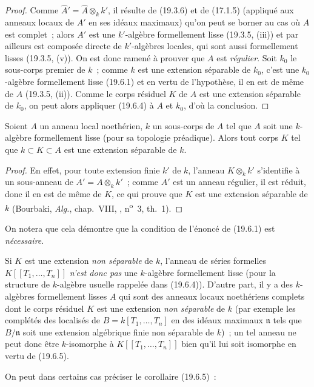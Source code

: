 \begin{proof}
Comme $\widehat A'=\widehat A\otimes_k k'$, il résulte de (19.3.6) et de
(17.1.5) (appliqué aux anneaux locaux de $A'$ en ses idéaux maximaux) qu'on
peut se borner au cas où $A$ est complet~; alors $A'$ est une $k'$-algèbre
formellement lisse (19.3.5, (iii)) et par ailleurs est composée directe de
$k'$-algèbres locales, qui sont aussi formellement lisses (19.3.5, (v)). On est
donc ramené à prouver que $A$ est \emph{régulier}. Soit $k_0$ le sous-corps
premier de $k$~; comme $k$ est une extension séparable de $k_0$, c'est une
$k_0$-algèbre formellement lisse (19.6.1) et en vertu de l'hypothèse, il en est
de même de $A$ (19.3.5, (ii)). Comme le corps résiduel $K$ de $A$ est une
extension séparable de $k_0$, on peut alors appliquer (19.6.4) à $A$ et $k_0$,
d'où la conclusion.
\end{proof}


\begin{corollary}[19.6.5.1]
\label{0.19.6.5.1-fr}
Soient $A$ un anneau local noethérien, $k$ un sous-corps de $A$ tel que $A$
soit une $k$-algèbre formellement lisse (pour sa topologie préadique). Alors
tout corps $K$ tel que $k\subset K\subset A$ est une extension séparable de
$k$.
\end{corollary}

\begin{proof}
En effet, pour toute extension finie $k'$ de $k$, l'anneau $K\otimes_k k'$ 
s'identifie à un sous-anneau de $A'=A\otimes_k k'$~; comme $A'$ est un anneau
régulier, il est réduit, donc il en est de même de $K$, ce qui prouve que $K$
est une extension séparable de $k$ (Bourbaki, \emph{Alg.}, chap.~VIII,
, n\textsuperscript{o}~3, th.~1).
\end{proof}

On notera que cela démontre que la condition de l'énoncé de (19.6.1) est
\emph{nécessaire}.

\begin{remark}[19.6.5.2]
\label{0.19.6.5.2-fr}
Si $K$ est une extension \emph{non séparable} de $k$, l'anneau de séries
formelles $K[[T_1,\ldots,T_n]]$ \emph{n'est donc pas} une $k$-algèbre
formellement lisse (pour la structure de $k$-algèbre usuelle rappelée dans
(19.6.4)). D'autre part, il y a des $k$-algèbres formellement lisses $A$ qui
sont des anneaux locaux noethériens complets dont le corps résiduel $K$ est une
extension \emph{non séparable} de $k$ (par exemple les complétés des localisés
de $B=k[T_1,\ldots,T_n]$ en des idéaux maximaux $\mathfrak n$ tels que
$B/\mathfrak n$ soit une extension algébrique finie non séparable de $k$)~; un
tel anneau ne peut donc être $k$-isomorphe à $K[[T_1,\ldots,T_n]]$ bien qu'il
lui soit isomorphe en vertu de (19.6.5).

On peut dans certains cas préciser le corollaire (19.6.5)~:
\end{remark}

